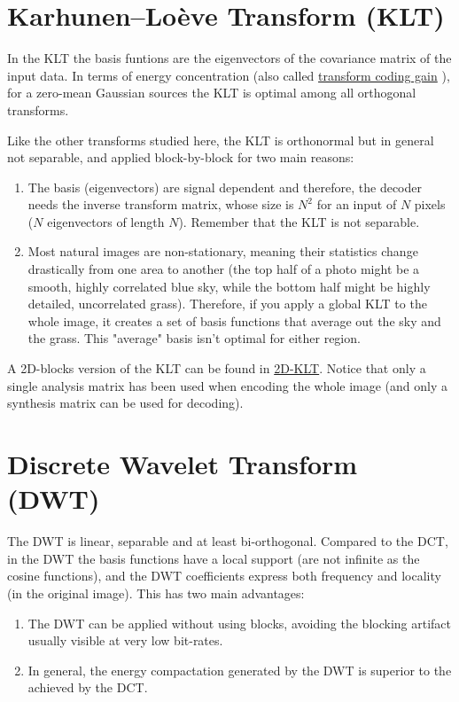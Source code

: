 \section{Karhunen–Loève Transform (KLT)}
In the KLT the basis funtions are the eigenvectors of the covariance
matrix of the input data. In terms of energy concentration (also
called
\href{https://web.stanford.edu/class/ee398a/handouts/lectures/07-TransformCoding.pdf}{transform
  coding gain} \cite{sayood2017introduction}), for a zero-mean
Gaussian sources the KLT is optimal among all orthogonal transforms.

Like the other transforms studied here, the KLT is orthonormal but in
general not separable, and applied block-by-block for two main
reasons:
\begin{enumerate}
\item The basis (eigenvectors) are signal dependent and therefore, the
  decoder needs the inverse transform matrix, whose size is $N^2$ for
  an input of $N$ pixels ($N$ eigenvectors of length $N$). Remember
  that the KLT is not separable.
\item Most natural images are non-stationary, meaning their statistics
  change drastically from one area to another (the top half of a photo
  might be a smooth, highly correlated blue sky, while the bottom half
  might be highly detailed, uncorrelated grass). Therefore, if you
  apply a global KLT to the whole image, it creates a set of basis
  functions that average out the sky and the grass. This "average"
  basis isn't optimal for either region.
\end{enumerate}

A 2D-blocks version of the KLT can be found in
\href{https://github.com/Sistemas-Multimedia/VCF/blob/main/notebooks/2D-KLT.ipynb}{2D-KLT}. Notice
that only a single analysis matrix has been used when encoding the
whole image (and only a synthesis matrix can be used for decoding).

\section{Discrete Wavelet Transform (DWT)}
The DWT is linear, separable and at least bi-orthogonal. Compared to
the DCT, in the DWT the basis functions have a local support (are not
infinite as the cosine functions), and the DWT coefficients express
both frequency and locality (in the original image). This has two main
advantages:
\begin{enumerate}
\item The DWT can be applied without using blocks, avoiding the
  blocking artifact usually visible at very low bit-rates.
\item In general, the energy compactation generated by the DWT is
  superior to the achieved by the DCT.
\end{enumerate}

